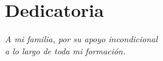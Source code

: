 \chapter*{Dedicatoria}

\vspace*{4cm}
\begin{flushright}
\itshape
A mi familia, por su apoyo incondicional\\
a lo largo de toda mi formación.
\end{flushright}
